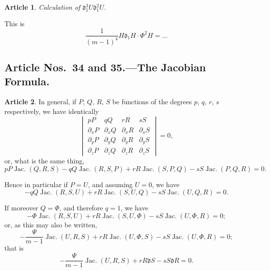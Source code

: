 \documentclass[12pt,a4paper]{article}
\theoremstyle{definition}
\newtheorem{art}{Article}[section]
\DeclareMathOperator{\Jac}{Jac.}
\begin{document}
\begin{art}
\textit{Calculation of} $\mathfrak{d}_1^3 U\mathfrak{d}_1^2 U$.

This is
\[
\frac{1}{(m - 1)^4}H\mathfrak{d}_1 H \cdot \Phi^2 H = \ldots
\]
\end{art}

\subsection*{Article Nos.\ 34 and 35.---The Jacobian Formula.}

\begin{art}
In general, if $P$, $Q$, $R$, $S$ be functions of the degrees $p$, $q$, $r$, $s$ respectively, we have identically
\[
\begin{vmatrix}
pP & qQ & rR & sS \\
\partial_x P & \partial_x Q & \partial_x R & \partial_x S \\
\partial_y P & \partial_y Q & \partial_y R & \partial_y S \\
\partial_z P & \partial_z Q & \partial_z R & \partial_z S
\end{vmatrix} = 0,
\]
or, what is the same thing,
\[
pP \Jac(Q, R, S) - qQ \Jac(R, S, P) + rR \Jac(S, P, Q) - sS \Jac(P, Q, R) = 0.
\]

Hence in particular if $P = U$, and assuming $U = 0$, we have
\[
-qQ \Jac(R, S, U) + rR \Jac(S, U, Q) - sS \Jac(U, Q, R) = 0.
\]

If moreover $Q = \Phi$, and therefore $q = 1$, we have
\[
-\Phi \Jac(R, S, U) + rR \Jac(S, U, \Phi) - sS \Jac(U, \Phi, R) = 0;
\]
or, as this may also be written,
\[
-\frac{\Psi}{m - 1}\Jac(U, R, S) + rR \Jac(U, \Phi, S) - sS \Jac(U, \Phi, R) = 0;
\]
that is
\[
-\frac{\Psi}{m - 1}\Jac(U, R, S) + rR\mathfrak{d}S - sS\mathfrak{d}R = 0.
\]
\end{art}
\end{document}
